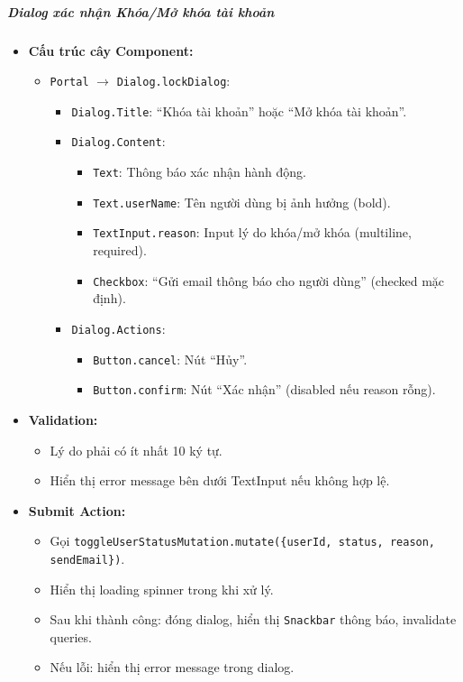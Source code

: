 \subparagraph{Dialog xác nhận Khóa/Mở khóa tài khoản}
\begin{itemize}
    \item \textbf{Cấu trúc cây Component:}
        \begin{itemize}
            \item \texttt{Portal} $\rightarrow$ \texttt{Dialog.lockDialog}:
                \begin{itemize}
                    \item \texttt{Dialog.Title}: ``Khóa tài khoản'' hoặc ``Mở khóa tài khoản''.
                    \item \texttt{Dialog.Content}:
                        \begin{itemize}
                            \item \texttt{Text}: Thông báo xác nhận hành động.
                            \item \texttt{Text.userName}: Tên người dùng bị ảnh hưởng (bold).
                            \item \texttt{TextInput.reason}: Input lý do khóa/mở khóa (multiline, required).
                            \item \texttt{Checkbox}: ``Gửi email thông báo cho người dùng'' (checked mặc định).
                        \end{itemize}
                    \item \texttt{Dialog.Actions}:
                        \begin{itemize}
                            \item \texttt{Button.cancel}: Nút ``Hủy''.
                            \item \texttt{Button.confirm}: Nút ``Xác nhận'' (disabled nếu reason rỗng).
                        \end{itemize}
                \end{itemize}
        \end{itemize}
    \item \textbf{Validation:}
        \begin{itemize}
            \item Lý do phải có ít nhất 10 ký tự.
            \item Hiển thị error message bên dưới TextInput nếu không hợp lệ.
        \end{itemize}
    \item \textbf{Submit Action:}
        \begin{itemize}
            \item Gọi \texttt{toggleUserStatusMutation.mutate(\{userId, status, reason, sendEmail\})}.
            \item Hiển thị loading spinner trong khi xử lý.
            \item Sau khi thành công: đóng dialog, hiển thị \texttt{Snackbar} thông báo, invalidate queries.
            \item Nếu lỗi: hiển thị error message trong dialog.
        \end{itemize}
\end{itemize}

